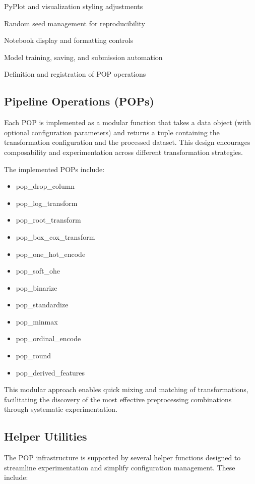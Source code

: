PyPlot and visualization styling adjustments

Random seed management for reproducibility

Notebook display and formatting controls

Model training, saving, and submission automation

Definition and registration of POP operations

\subsection{Pipeline Operations (POPs)}\label{subsec:pipeline-operations-(pops)}
Each POP is implemented as a modular function that takes a data object (with optional configuration parameters) and returns a tuple containing the transformation configuration and the processed dataset.
This design encourages composability and experimentation across different transformation strategies.

The implemented POPs include:

\begin{itemize}
    \item pop\_drop\_column
    \item pop\_log\_transform
    \item pop\_root\_transform
    \item pop\_box\_cox\_transform
    \item pop\_one\_hot\_encode
    \item pop\_soft\_ohe
    \item pop\_binarize
    \item pop\_standardize
    \item pop\_minmax
    \item pop\_ordinal\_encode
    \item pop\_round
    \item pop\_derived\_features
\end{itemize}

This modular approach enables quick mixing and matching of transformations, facilitating the discovery of the most effective preprocessing combinations through systematic experimentation.

\subsection{Helper Utilities}\label{subsec:helper-utilities}
The POP infrastructure is supported by several helper functions designed to streamline experimentation and simplify configuration management.
These include:

